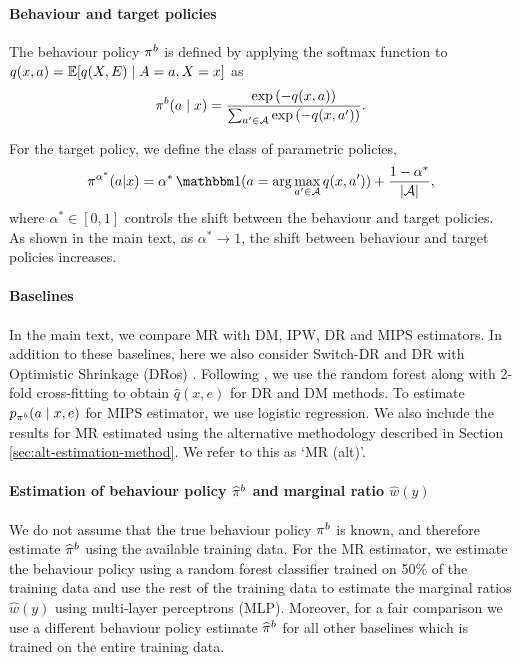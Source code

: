 \paragraph{Behaviour and target policies}
The behaviour policy $\pi^b$ is defined by applying the softmax function to $q(x, a) = \mathbb{E}[q(X, E)\mid A=a, X=x]$ as 
\[
\pi^b(a\mid x) = \frac{\exp{(-q(x, a))}}{\sum_{a'\in \mathcal{A}}\exp{(-q(x, a'))}}.
\]

For the target policy, we define the class of parametric policies,
\[
\pi^{\alpha^\ast}(a | x) = \alpha^\ast\,\ind(a = \arg\max_{a'\in \Aspace} q(x, a')) + \frac{1-\alpha^\ast}{|\Aspace|},
\]
where $\alpha^\ast \in [0, 1]$ controls the shift between the behaviour and target policies. As shown in the main text, as $\alpha^\ast \rightarrow 1$, the shift between behaviour and target policies increases.

\paragraph{Baselines}
In the main text, we compare MR with DM, IPW, DR and MIPS estimators. In addition to these baselines, here we also consider Switch-DR \citep{wang2017optimal} and DR with Optimistic Shrinkage (DRos) \citep{su2020doubly}.
Following \cite{saito2022off}, we use the random forest \citep{breiman2001machine} along with 2-fold cross-fitting \citep{newey2018cross} to obtain $\hat{q}(x, e)$ for DR and DM methods.
To estimate $p_{\pi^b}(a\mid x, e)$ for MIPS estimator, we use logistic regression. 
We also include the results for MR estimated using the alternative methodology described in Section \ref{sec:alt-estimation-method}. We refer to this as `MR (alt)'.

\paragraph{Estimation of behaviour policy $\widehat{\pi}^b$ and marginal ratio $\hat{w}(y)$}
We do not assume that the true behaviour policy $\pi^b$ is known, and therefore estimate $\widehat{\pi}^b$ using the available training data.
For the MR estimator, we estimate the behaviour policy using a random forest classifier trained on 50\% of the training data and use the rest of the training data to estimate the marginal ratios $\hat{w}(y)$ using multi-layer perceptrons (MLP). Moreover, for a fair comparison we use a different behaviour policy estimate $\widehat{\pi}^b$ for all other baselines which is trained on the entire training data. 


